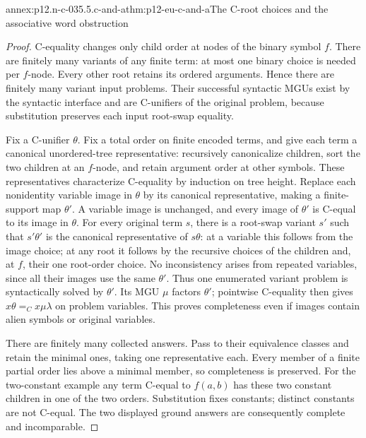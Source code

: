 \begin{annexitem}{annex:p12.n-c-035.5.c-and-a}{thm:p12-eu-c-and-a}{The C-root choices and the associative word obstruction}
\begin{proof}
C-equality changes only child order at nodes of the binary symbol \(f\).
There are finitely many variants of any finite term: at most one
binary choice is needed per \(f\)-node. Every other root retains
its ordered arguments. Hence there are finitely many variant input
problems. Their successful syntactic MGUs exist by the syntactic
interface and are C-unifiers of the original problem, because
substitution preserves each input root-swap equality.

Fix a C-unifier \(\theta\). Fix a total order on finite encoded terms,
and give each term a canonical unordered-tree representative: recursively
canonicalize children, sort the two children at an \(f\)-node, and
retain argument order at other symbols. These representatives characterize
C-equality by induction on tree height. Replace each nonidentity
variable image in \(\theta\) by its canonical representative, making
a finite-support map \(\theta'\). A variable image is unchanged, and
every image of \(\theta'\) is C-equal to its image in \(\theta\).
For every original term \(s\), there is a root-swap variant \(s'\)
such that \(s'\theta'\) is the canonical representative of
\(s\theta\): at a variable this follows from the image choice;
at any root it follows by the recursive choices of the children and,
at \(f\), their one root-order choice. No inconsistency arises from
repeated variables, since all their images use the same \(\theta'\).
Thus one enumerated variant problem is syntactically solved by
\(\theta'\). Its MGU \(\mu\) factors \(\theta'\); pointwise
C-equality then gives \(x\theta=_C x\mu\lambda\) on problem
variables. This proves completeness even if images contain alien
symbols or original variables.

There are finitely many collected answers. Pass to their equivalence
classes and retain the minimal ones, taking one representative each.
Every member of a finite partial order lies above a minimal member,
so completeness is preserved. For the two-constant example any term
C-equal to \(f(a,b)\) has these two constant children in one of
the two orders. Substitution fixes constants; distinct constants are
not C-equal. The two displayed ground answers are consequently
complete and incomparable.


\end{proof}
\end{annexitem}
